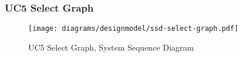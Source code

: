 \subsubsection{UC5 Select Graph}
\begin{figure}[H]
    \centering
    \texttt{[image: diagrams/designmodel/ssd-select-graph.pdf]}
    \caption{UC5 Select Graph, System Sequence Diagram}
    \label{fig:select-graph-ssd}
\end{figure}
% 
